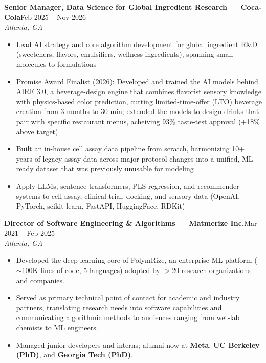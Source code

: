 \documentclass[10pt,letterpaper]{article}
\newcommand{\role}[3]{%
  \noindent\textbf{#1}\hfill{\small #2}\\
  {\small\textit{#3}}\par\vspace{3pt}%
}
\begin{document}
\role{Senior Manager, Data Science for Global Ingredient Research — Coca-Cola}{Feb 2025 – Nov 2026}{Atlanta, GA}
\begin{itemize}
  \item Lead AI strategy and core algorithm development for global ingredient R\&D (sweeteners, flavors, emulsifiers, wellness ingredients), spanning small molecules to formulations
  \item Promise Award Finalist (2026): Developed and trained the AI models behind AIRE 3.0, a beverage-design engine that combines flavorist sensory knowledge with physics-based color prediction, cutting limited-time-offer (LTO) beverage creation from 3 months to 30 min; extended the models to design drinks that pair with specific restaurant menus, acheiving 93\% taste-test approval (+18\% above target)
  \item Built an in-house cell assay data pipeline from scratch, harmonizing 10+ years of legacy assay data across major protocol changes into a unified, ML-ready dataset that was previously unusable for modeling
  \item Apply LLMs, sentence transformers, PLS regression, and recommender systems to cell assay, clinical trial, docking, and sensory data (OpenAI, PyTorch, scikit-learn, FastAPI, HuggingFace, RDKit)
\end{itemize}

\vspace{5pt}

\role{Director of Software Engineering \& Algorithms — Matmerize Inc.}{Mar 2021 – Feb 2025}{Atlanta, GA}
\vspace{3pt}
\begin{itemize}
  \item Developed the deep learning core of PolymRize\texttrademark, an enterprise ML platform
    ($\sim$100K lines of code, 5 languages) adopted by $>$20 research organizations and companies.

  \item Served as primary technical point of contact for academic and industry partners,
    translating research needs into software capabilities and communicating algorithmic methods
    to audiences ranging from wet-lab chemists to ML engineers.

  \item Managed junior developers and interns; alumni now at \textbf{Meta}, 
    \textbf{UC Berkeley (PhD)}, and \textbf{Georgia Tech (PhD)}.
\end{itemize}
\end{document}
